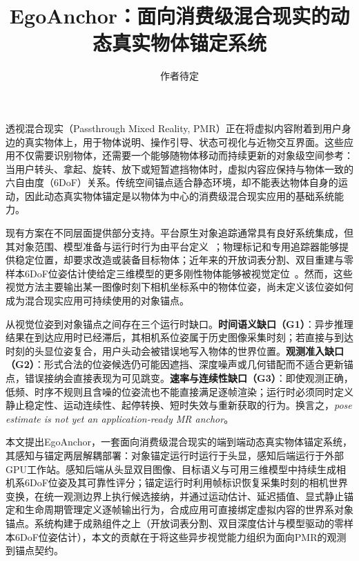 \documentclass[review]{vgtc}
\title{EgoAnchor：面向消费级混合现实的动态真实物体锚定系统}
\author{作者待定}
\begin{document}
\label{sec:introduction}
\maketitle

透视混合现实（Passthrough Mixed Reality, PMR）正在将虚拟内容附着到用户身边的真实物体上，用于物体说明、操作引导、状态可视化与近物交互界面。这些应用不仅需要识别物体，还需要一个能够随物体移动而持续更新的对象级空间参考：当用户转头、拿起、旋转、放下或短暂遮挡物体时，虚拟内容应保持与物体一致的六自由度（6DoF）关系。传统空间锚点适合静态环境，却不能表达物体自身的运动，因此动态真实物体锚定是以物体为中心的消费级混合现实应用的基础系统能力。

现有方案在不同层面提供部分支持。平台原生对象追踪通常具有良好系统集成，但其对象范围、模型准备与运行时行为由平台定义~\cite{appleObjectAnchor,azureObjectAnchors,metaDynamicObjectTracker}；物理标记和专用追踪器能够提供稳定位置，却要求改造或装备目标物体；近年来的开放词表分割、双目重建与零样本6DoF位姿估计使给定三维模型的更多刚性物体能够被视觉定位~\cite{foundationpose2023,megapose2022}。然而，这些视觉方法主要输出某一图像时刻下相机坐标系中的物体位姿，尚未定义该位姿如何成为混合现实应用可持续使用的对象锚点。

从视觉位姿到对象锚点之间存在三个运行时缺口。\textbf{时间语义缺口（G1）}：异步推理结果在到达应用时已经滞后，其相机系位姿属于历史图像采集时刻；若直接与到达时刻的头显位姿复合，用户头动会被错误地写入物体的世界位置。\textbf{观测准入缺口（G2）}：形式合法的位姿候选仍可能因遮挡、深度噪声或几何错配而不适合更新锚点，错误接纳会直接表现为可见跳变。\textbf{速率与连续性缺口（G3）}：即使观测正确，低频、时序不规则且含噪的位姿流也不能直接满足逐帧渲染；运行时必须同时定义静止稳定性、运动连续性、起停转换、短时失效与重新获取的行为。换言之，\emph{pose estimate is not yet an application-ready MR anchor}。

本文提出EgoAnchor，一套面向消费级混合现实的端到端动态真实物体锚定系统，其感知与锚定两层解耦部署：对象锚定运行时运行于头显，感知后端运行于外部GPU工作站。感知后端从头显双目图像、目标语义与可用三维模型中持续生成相机系6DoF位姿及其可靠性评分；锚定运行时利用帧标识恢复采集时刻的相机世界变换，在统一观测边界上执行候选接纳，并通过运动估计、延迟插值、显式静止锚定和生命周期管理定义逐帧输出行为，合成应用可直接绑定虚拟内容的世界系对象锚点。系统构建于成熟组件之上（开放词表分割、双目深度估计与模型驱动的零样本6DoF位姿估计），本文的贡献在于将这些异步视觉能力组织为面向PMR的观测到锚点契约。
\end{document}
